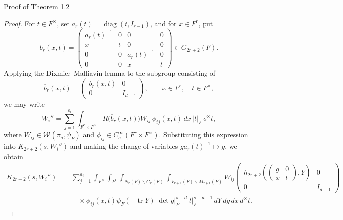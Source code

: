 \documentclass[12pt,reqno]{amsart}
\numberwithin{equation}{section}%
\numberwithin{equation}{subsection}
\theoremstyle{definition}
\theoremstyle{remark}
\begin{document}
\begin{section}{Proof of Theorem 1.2}
\begin{proof}
For $t\in F^\times$, set $a_r(t)=\operatorname{diag}(t,I_{r-1})$, and for $x\in F^r$, put
\[
  b_r(x,t) = \begin{pmatrix} a_r(t)^{-1}&0&0&0\\ x&t&0&0\\ 0&0&a_r(t)^{-1}&0\\ 0&0&x&t \end{pmatrix} \in G_{2r+2}(F).
\]
Applying the Dixmier--Malliavin lemma to the subgroup consisting of
\[
  \overline{b}_r(x,t) = \begin{pmatrix} b_r(x,t)&0\\ 0&I_{d-1} \end{pmatrix}, \qquad x\in F^r, \quad t\in F^\times,
\]
we may write
\[
  W_i'' = \sum_{j=1}^{a_i} \int_{F^r\times F^\times} R\bigl(\overline{b}_r(x,t)\bigr)W_{ij}\, \phi_{ij}(x,t)\,dx\,|t|_F\,d^\times t,
\]
where $W_{ij}\in\mathcal{W}(\pi_\sigma,\psi_F)$ and $\phi_{ij}\in C_c^\infty(F^r\times F^\times)$. Substituting this expression into $K_{2r+2}(s,W_i'')$ and making the change of variables $ga_r(t)^{-1}\mapsto g$, we obtain
\[
  \begin{aligned}
    K_{2r+2}(s,W_i'') ={}& \sum_{j=1}^{a_i} \int_{F^\times} \int_{F^r} \int_{N_r(F)\backslash G_r(F)} \int_{V_{r+1}(F)\backslash M_{r+1}(F)} W_{ij}\begin{pmatrix} h_{2r+2}\left( \begin{pmatrix}g&0\\x&t\end{pmatrix},Y \right)&0\\ 0&I_{d-1} \end{pmatrix}\\
    &\quad\times \phi_{ij}(x,t)\psi_F(-\operatorname{tr}Y) |\det g|_F^{s-d}|t|_F^{s-d+1} \,dY\,dg\,dx\,d^\times t.
  \end{aligned}
\]


\end{proof}
\end{section}
\end{document}
